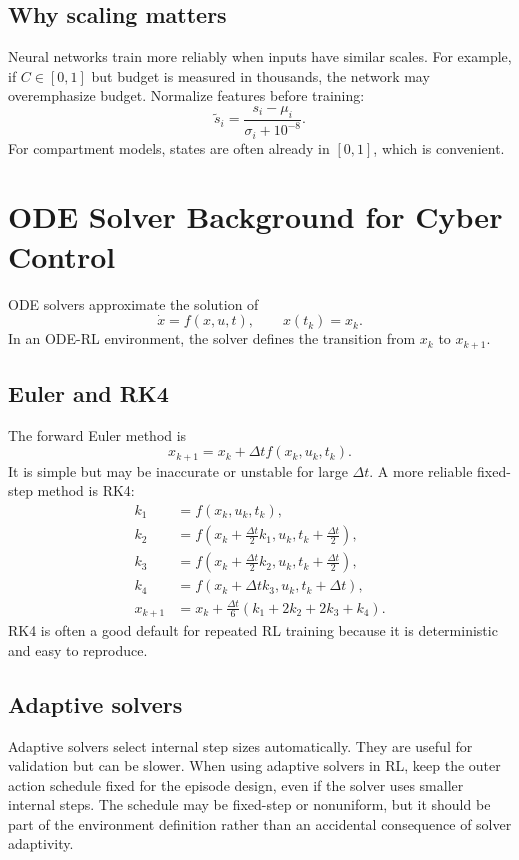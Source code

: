 \documentclass[11pt,a4paper]{article}
\begin{document}
\subsection{Why scaling matters}
Neural networks train more reliably when inputs have similar scales. For example, if $C\in[0,1]$ but budget is measured in thousands, the network may overemphasize budget. Normalize features before training:
\begin{equation}
    \tilde{s}_i=\frac{s_i-\mu_i}{\sigma_i+10^{-8}}.
\end{equation}
For compartment models, states are often already in $[0,1]$, which is convenient.

\section{ODE Solver Background for Cyber Control}\label{app:ode-background}
ODE solvers approximate the solution of
\begin{equation}
    \dot{x}=f(x,u,t),\qquad x(t_k)=x_k.
\end{equation}
In an ODE-RL environment, the solver defines the transition from $x_k$ to $x_{k+1}$.

\subsection{Euler and RK4}
The forward Euler method is
\begin{equation}
    x_{k+1}=x_k+\Delta t f(x_k,u_k,t_k).
\end{equation}
It is simple but may be inaccurate or unstable for large $\Delta t$. A more reliable fixed-step method is RK4:
\begin{align}
    k_1&=f(x_k,u_k,t_k),\\
    k_2&=f(x_k+\frac{\Delta t}{2}k_1,u_k,t_k+\frac{\Delta t}{2}),\\
    k_3&=f(x_k+\frac{\Delta t}{2}k_2,u_k,t_k+\frac{\Delta t}{2}),\\
    k_4&=f(x_k+\Delta t k_3,u_k,t_k+\Delta t),\\
    x_{k+1}&=x_k+\frac{\Delta t}{6}(k_1+2k_2+2k_3+k_4).
\end{align}
RK4 is often a good default for repeated RL training because it is deterministic and easy to reproduce.

\subsection{Adaptive solvers}
Adaptive solvers select internal step sizes automatically. They are useful for validation but can be slower. When using adaptive solvers in RL, keep the outer action schedule fixed for the episode design, even if the solver uses smaller internal steps. The schedule may be fixed-step or nonuniform, but it should be part of the environment definition rather than an accidental consequence of solver adaptivity.
\end{document}
